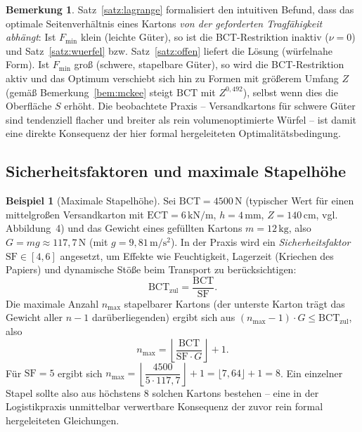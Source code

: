 ﻿\documentclass[a4paper,12pt]{article}
\theoremstyle{definition}
\newtheorem{beispiel}{Beispiel}
\newtheorem{bemerkung}{Bemerkung}
\begin{document}
\begin{bemerkung}
	Satz~\ref{satz:lagrange} formalisiert den intuitiven Befund, dass das
	optimale Seitenverhältnis eines Kartons \emph{von der geforderten
	Tragfähigkeit abhängt}: Ist $F_{\min}$ klein (leichte Güter), so ist die
	BCT-Restriktion inaktiv ($\nu = 0$) und Satz~\ref{satz:wuerfel} bzw.
	Satz~\ref{satz:offen} liefert die Lösung (würfelnahe Form). Ist $F_{\min}$
	groß (schwere, stapelbare Güter), so wird die BCT-Restriktion aktiv und das
	Optimum verschiebt sich hin zu Formen mit größerem Umfang $Z$ (gemäß
	Bemerkung~\ref{bem:mckee} steigt $\mathrm{BCT}$ mit $Z^{0{,}492}$), selbst
	wenn dies die Oberfläche $S$ erhöht. Die beobachtete Praxis -- Versandkartons
	für schwere Güter sind tendenziell flacher und breiter als rein
	volumenoptimierte Würfel -- ist damit eine direkte Konsequenz der hier
	formal hergeleiteten Optimalitätsbedingung.
\end{bemerkung}

\subsection{Sicherheitsfaktoren und maximale Stapelhöhe}

\begin{beispiel}[Maximale Stapelhöhe]
	Sei $\mathrm{BCT} = 4500\,\mathrm{N}$ (typischer Wert für einen mittelgroßen
	Versandkarton mit $\mathrm{ECT} = 6\,\mathrm{kN/m}$, $h = 4\,\mathrm{mm}$,
	$Z = 140\,\mathrm{cm}$, vgl. Abbildung~4) und das Gewicht eines gefüllten
	Kartons $m = 12\,\mathrm{kg}$, also $G = mg \approx 117{,}7\,\mathrm{N}$
	(mit $g = 9{,}81\,\mathrm{m/s^2}$). In der Praxis wird ein
	\emph{Sicherheitsfaktor} $\mathrm{SF} \in [4,6]$ angesetzt, um Effekte wie
	Feuchtigkeit, Lagerzeit (Kriechen des Papiers) und dynamische Stöße beim
	Transport zu berücksichtigen:
	\[
		\mathrm{BCT}_{\mathrm{zul}} = \frac{\mathrm{BCT}}{\mathrm{SF}}.
	\]
	Die maximale Anzahl $n_{\max}$ stapelbarer Kartons (der unterste Karton
	trägt das Gewicht aller $n-1$ darüberliegenden) ergibt sich aus
	$(n_{\max}-1) \cdot G \leq \mathrm{BCT}_{\mathrm{zul}}$, also
	\[
		n_{\max} = \left\lfloor \frac{\mathrm{BCT}}{\mathrm{SF}\cdot G} \right\rfloor + 1.
	\]
	Für $\mathrm{SF} = 5$ ergibt sich
	$n_{\max} = \left\lfloor \dfrac{4500}{5 \cdot 117{,}7} \right\rfloor + 1
	= \lfloor 7{,}64 \rfloor + 1 = 8$. Ein einzelner Stapel sollte also aus
	höchstens $8$ solchen Kartons bestehen -- eine in der Logistikpraxis
	unmittelbar verwertbare Konsequenz der zuvor rein formal hergeleiteten
	Gleichungen.
\end{beispiel}
\end{document}
